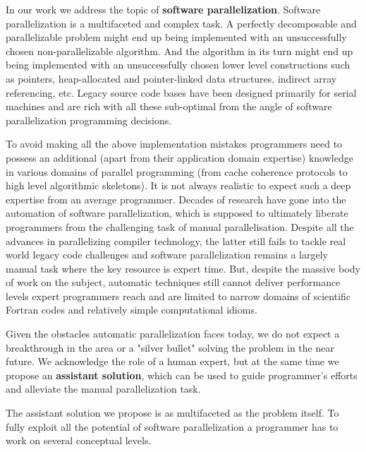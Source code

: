 \documentclass[10pt,a4paper]{report}
\begin{document}

\quad In our work we address the topic of \textbf{software parallelization}. Software parallelization is a multifaceted and complex task. A perfectly decomposable and parallelizable problem might end up being implemented with an unsuccessfully chosen non-parallelizable algorithm. And the algorithm in its turn might end up being implemented with an unsuccessfully chosen lower level constructions such as pointers, heap-allocated and pointer-linked data structures, indirect array referencing, etc. Legacy source code bases have been designed primarily for serial machines and are rich with all these sub-optimal from the angle of software parallelization programming decisions.


\quad To avoid making all the above implementation mistakes programmers need to possess an additional (apart from their application domain expertise) knowledge in various domains of parallel programming (from cache coherence protocols to high level algorithmic skeletons). It is not always realistic to expect such a deep expertise from an average programmer. Decades of research have gone into the automation of software parallelization, which is supposed to ultimately liberate programmers from the challenging task of manual parallelisation. Despite all the advances in parallelizing compiler technology, the latter still fails to tackle real world legacy code challenges and software parallelization remains a largely manual task where the key resource is expert time. But, despite the massive body of work on the subject, automatic techniques still cannot deliver performance levels expert programmers reach and are limited to narrow domains of scientific Fortran codes and relatively simple computational idioms.


\quad Given the obstacles automatic parallelization faces today, we do not expect a breakthrough in the area or a "silver bullet" solving the problem in the near future. We acknowledge the role of a human expert, but at the same time we propose an \textbf{assistant solution}, which can be used to guide programmer's efforts and alleviate the manual parallelization task.


\quad The assistant solution we propose is as multifaceted as the problem itself. To fully exploit all the potential of software parallelization a programmer has to work on several conceptual levels. 
\end{document}
